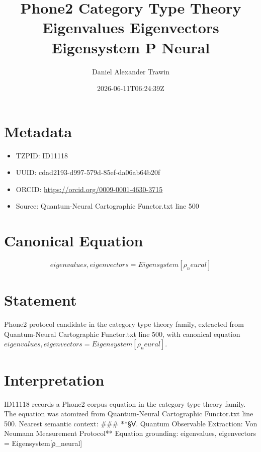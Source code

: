 \documentclass[11pt]{article}
\title{Phone2 Category Type Theory Eigenvalues Eigenvectors Eigensystem Ρ Neural}
\author{Daniel Alexander Trawin}
\date{2026-06-11T06:24:39Z}
\begin{document}
\maketitle
\section*{Metadata}
\begin{itemize}
\item TZPID: ID11118
\item UUID: cdad2193-d997-579d-85ef-da06ab64b20f
\item ORCID: \url{https://orcid.org/0009-0001-4630-3715}
\item Source: Quantum-Neural Cartographic Functor.txt line 500
\end{itemize}
\section*{Canonical Equation}
\[
{eigenvalues, eigenvectors} = Eigensystem[ρ_neural]
\]
\section*{Statement}
Phone2 protocol candidate in the category type theory family, extracted from Quantum-Neural Cartographic Functor.txt line 500, with canonical equation ${eigenvalues, eigenvectors} = Eigensystem[ρ_neural]$.
\section*{Interpretation}
ID11118 records a Phone2 corpus equation in the category type theory family. The equation was atomized from Quantum-Neural Cartographic Functor.txt line 500. Nearest semantic context: ### **§Ⅴ. Quantum Observable Extraction: Von Neumann Measurement Protocol** Equation grounding: {eigenvalues, eigenvectors} = Eigensystem[ρ_neural]
\end{document}
